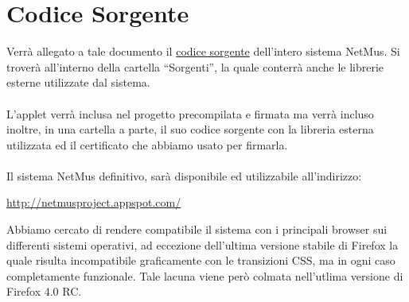 \chapter{Codice Sorgente}
\thispagestyle{fancy} %

Verr\`a allegato a tale documento il \underline{codice sorgente} dell'intero
sistema NetMus. Si trover\`a all'interno della cartella ``Sorgenti'', la quale
conterr\`a anche le librerie esterne utilizzate dal sistema.\\
\\
L'applet verr\`a inclusa nel progetto precompilata e firmata ma verr\`a incluso
inoltre, in una cartella a parte, il suo codice sorgente con la libreria
esterna utilizzata ed il certificato che abbiamo usato per firmarla.\\
\\
Il sistema NetMus definitivo, sar\`a disponibile ed utilizzabile
all'indirizzo:\\ 
\begin{center}
\url{http://netmusproject.appspot.com/}
\end{center}
\vspace{0.5cm}
Abbiamo cercato di rendere compatibile il sistema con i principali
browser sui differenti sistemi operativi, ad eccezione dell'ultima versione
stabile di Firefox la quale risulta incompatibile graficamente con le
transizioni CSS, ma in ogni caso completamente funzionale. Tale lacuna viene
per\`o colmata nell'utlima versione di Firefox 4.0 RC.

\listoftables
{}
\listoffigures
{}

